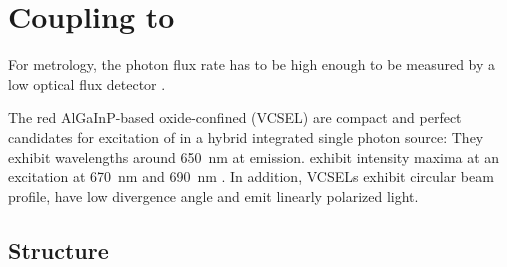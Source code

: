 
\section[VCSELs]{Coupling \sivs to \Vcsels} \label{sec::coupling_vcsel}

	For metrology, the photon flux rate has to be high enough to be measured by a low optical flux detector \cite{Vaigu2017}.
	
	The red AlGaInP-based oxide-confined \vcsels (VCSEL) are compact and perfect candidates for excitation of \sivs in a hybrid integrated single photon source: 
	They exhibit wavelengths around \SI{650}{nm} at \cw emission.
	\sivs exhibit intensity maxima at an excitation at \SI{670}{nm} and \SI{690}{nm} \cite{}. 
	In addition, VCSELs exhibit circular beam profile, have low divergence angle and emit linearly polarized light.

	\subsection{\Vcsel Structure}\label{subsec::vcsel_structure}


